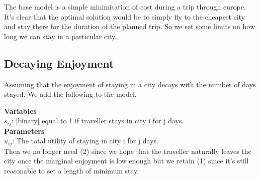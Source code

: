 \documentclass[12pt]{article}
\begin{document}
The base model is a simple minimisation of cost during a trip through europe. It's clear that the optimal solution would be to simply fly to the cheapest city and stay there for the duration of the planned trip. So we set some limits on how long we can stay in a particular city.

\newpage
\subsection{Decaying Enjoyment}
Assuming that the enjoyment of staying in a city decays with the number of days stayed. We add the following to the model.

\textbf{Variables}\\
$s_{ij}$: [binary] equal to 1 if traveller stays in city i for j days.\\

\textbf{Parameters} \\
$u_{ij}$: The total utility of staying in city i for j days.\\

Then we no longer need (2) since we hope that the traveller naturally leaves the city once the marginal enjoyment is low enough but we retain (1) since it's still reasonable to set a length of minimum stay.
\end{document}
